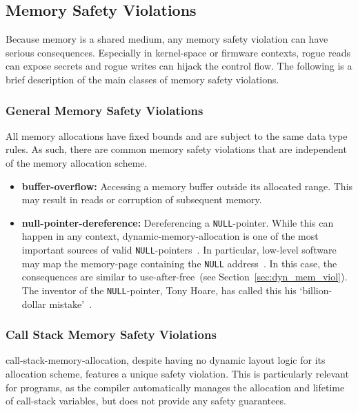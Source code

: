 \subsection{Memory Safety Violations}
\label{sec:mem_violations}

Because memory is a shared medium, any memory safety violation can have serious consequences. Especially in \gls{kernel-space} or \gls{firmware} contexts, rogue reads can expose secrets and rogue writes can hijack the control flow. The following is a brief description of the main classes of memory safety violations.

\subsubsection{General Memory Safety Violations}

All memory allocations have fixed bounds and are subject to the same data type rules. As such, there are common memory safety violations that are independent of the memory allocation scheme.

\begin{itemize}
  \item \textbf{\Gls{buffer-overflow}:} Accessing a memory buffer outside its allocated range. This may result in reads or corruption of subsequent memory.
  \item \textbf{\Gls{null-pointer-dereference}:} Dereferencing a \lstinline[style=c]{NULL}-pointer. While this can happen in any context, \gls{dynamic-memory-allocation} is one of the most important sources of valid \lstinline[style=c]{NULL}-pointers~\cite{ISO:2018:III}. In particular, low-level software may map the \gls{memory-page} containing the \lstinline[style=c]{NULL} address~\cite{edk2}. In this case, the consequences are similar to \gls{use-after-free}~(see Section~\ref{sec:dyn_mem_viol}). The inventor of the \lstinline[style=c]{NULL}-pointer, Tony Hoare, has called this his `billion-dollar mistake'~\cite{null-ref-presentation}.
\end{itemize}

\subsubsection{Call Stack Memory Safety Violations}

\Gls{call-stack-memory-allocation}, despite having no dynamic layout logic for its allocation scheme, features a unique safety violation. This is particularly relevant for  programs, as the compiler automatically manages the allocation and lifetime of \gls{call-stack} variables, but does not provide any safety guarantees.


